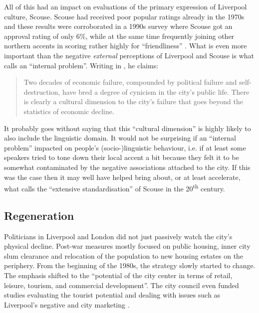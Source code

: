 All of this had an impact on evaluations of the primary expression of Liverpool culture, Scouse.
Scouse had received poor popular ratings already in the 1970s and these results were corroborated in a 1990s survey where Scouse got an approval rating of only 6\%, while at the same time frequently joining other northern accents in scoring rather highly for ``friendliness'' \citep[cf.][166]{wales2006}.
What is even more important than the negative \emph{external} perceptions of Liverpool and Scouse is what \citet[255]{parkinson1990} calls an ``internal  problem''.
Writing in \citeyear{parkinson1990}, he claims: 
	\begin{quote}
		Two decades of economic failure, compounded by political failure and self-destruction, have bred a degree of cynicism in the city's public life. There is clearly a cultural dimension to the city's failure that goes beyond the statistics of economic decline.
	\end{quote}

 
It probably goes without saying that this ``cultural dimension'' is highly likely to also include the linguistic domain.
It would not be surprising if an ``internal  problem'' impacted on people's (socio-)linguistic behaviour, i.e. if at least some speakers tried to tone down their local accent a bit because they felt it to be somewhat contaminated by the negative associations attached to the city.
If this was the case then it may well have helped bring about, or at least accelerate, what \citet{knowles1978} calls the ``extensive standardisation'' of Scouse in the 20\textsuperscript{th} century.

		\subsection{Regeneration}\label{sec.hist.20.regen}

Politicians in Liverpool and London did not just passively watch the city's physical decline.
Post-war measures mostly focused on public housing, inner city slum clearance and relocation of the population to new housing estates on the periphery.
From the beginning of the 1980s, the strategy slowly started to change.
The emphasis shifted to the ``potential of the city center in terms of retail, leisure, tourism, and commercial development''.
The city council even funded studies evaluating the tourist potential and dealing with issues such as Liverpool's negative  and city marketing \citep[cf.][250--253]{parkinson1990}.

